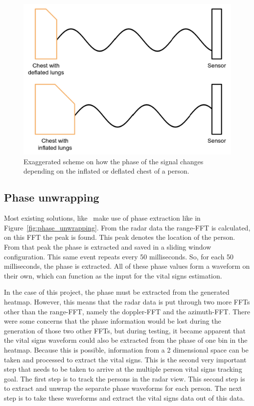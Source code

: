 \begin{figure}[t]
\centering
\includegraphics[width=.7\textwidth]{figures/measuring_vital_signs/phase_difference.png}
\caption{Exaggerated scheme on how the phase of the signal changes depending on the inflated or deflated chest of a person.}
\label{fig:phase_difference}
\end{figure}

\subsection{Phase unwrapping}
Most existing solutions, like~\cite{li2009radar, yang2016monitoring, alizadeh2019remote} make use of phase extraction like in Figure~\ref{fig:phase_unwrapping}. From the radar data the range-FFT is calculated, on this FFT the peak is found. This peak denotes the location of the person. From that peak the phase is extracted and saved in a sliding window configuration. This same event repeats every 50 milliseconds. So, for each 50 milliseconds, the phase is extracted. All of these phase values form a waveform on their own, which can function as the input for the vital signs estimation. 

In the case of this project, the phase must be extracted from the generated heatmap. However, this means that the radar data is put through two more FFTs other than the range-FFT, namely the doppler-FFT and the azimuth-FFT. There were some concerns that the phase information would be lost during the generation of those two other FFTs, but during testing, it became apparent that the vital signs waveform could also be extracted from the phase of one bin in the heatmap. Because this is possible, information from a 2 dimensional space can be taken and processed to extract the vital signs. This is the second very important step that needs to be taken to arrive at the multiple person vital signs tracking goal. The first step is to track the persons in the radar view. This second step is to extract and unwrap the separate phase waveforms for each person. The next step is to take these waveforms and extract the vital signs data out of this data.

